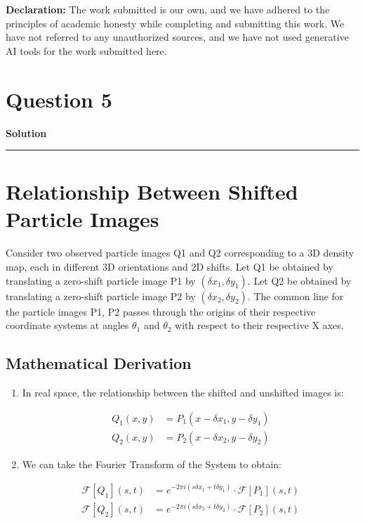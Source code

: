\documentclass[a4paper,12pt]{article}
\title{\cooltitle{CS754 Assignment-3}}
\author{{\bf Saksham Rathi, Ekansh Ravi Shankar, Kshitij Vaidya}}
\date{}
\newenvironment{solution}[2][]{%
    \begin{mdframed}[linecolor=blue!70!black, linewidth=2pt, roundcorner=10pt, backgroundcolor=yellow!10!white, skipabove=12pt, skipbelow=12pt]%
        \textbf{\large #2}
        \par\noindent\rule{\textwidth}{0.4pt}
}{
    \end{mdframed}
}
\begin{document}
\maketitle
\textbf{Declaration:} The work submitted is our own, and
we have adhered to the principles of academic honesty while completing and submitting this work. We have not referred to any unauthorized sources, and we have not used generative AI tools for the work submitted here.

\section*{Question 5}

\begin{solution}{Solution}

\section{Relationship Between Shifted Particle Images}

Consider two observed particle images Q1 and Q2 corresponding to a 3D density map, each in different 3D orientations and 2D shifts. Let Q1 be obtained by translating a zero-shift particle image P1 by $(\delta x_1, \delta y_1)$. Let Q2 be obtained by translating a zero-shift particle image P2 by $(\delta x_2, \delta y_2)$. The common line for the particle images P1, P2 passes through the origins of their respective coordinate systems at angles $\theta_1$ and $\theta_2$ with respect to their respective X axes.

\subsection{Mathematical Derivation}
\begin{enumerate}

\item In real space, the relationship between the shifted and unshifted images is:

   \begin{align}
   Q_1(x,y) &= P_1(x-\delta x_1, y-\delta y_1) \\
   Q_2(x,y) &= P_2(x-\delta x_2, y-\delta y_2)
   \end{align}

\item We can take the Fourier Transform of the System to obtain:

   \begin{align}
   \mathcal{F}[Q_1](s,t) &= e^{-2\pi i(s\delta x_1 + t\delta y_1)} \cdot \mathcal{F}[P_1](s,t) \\
   \mathcal{F}[Q_2](s,t) &= e^{-2\pi i(s\delta x_2 + t\delta y_2)} \cdot \mathcal{F}[P_2](s,t)
   \end{align}


\end{enumerate}
\end{solution}
\end{document}

